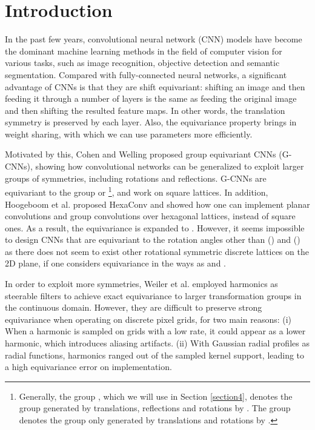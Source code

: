 \documentclass{article}
\begin{document}
\section{Introduction \label{intro}}
In the past few years, convolutional neural network (CNN) models have become the dominant machine learning methods in the field of computer vision for various tasks, such as image recognition, objective detection and semantic segmentation. Compared with fully-connected neural networks, a significant advantage of CNNs is that they are shift equivariant: shifting an image and then feeding it through a number of layers is the same as feeding the original image and then shifting the resulted feature maps. In other words, the translation symmetry is preserved by each layer. Also, the equivariance property brings in weight sharing, with which we can use parameters more efficiently.

Motivated by this, Cohen and Welling  proposed group equivariant CNNs (G-CNNs), showing how convolutional networks can be generalized to exploit larger groups of symmetries, including rotations and reflections. G-CNNs are equivariant to the group  or \footnote{Generally, the group , which we will use in Section \ref{section4}, denotes the group generated by translations, reflections and rotations by . The group  denotes the group only generated by translations and rotations by .}, and work on square lattices. In addition, Hoogeboom et al.  proposed HexaConv and showed how one can implement planar convolutions and group convolutions over hexagonal lattices, instead of square ones. As a result, the equivariance is expanded to . However, it seems impossible to design CNNs that are equivariant to the rotation angles other than  () and  () as there does not seem to exist other rotational symmetric discrete lattices on the 2D plane, if one considers equivariance in the ways as \cite{cohen2016group} and \cite{hoogeboom2018hexaconv}.

In order to exploit more symmetries, Weiler et al.  employed harmonics as steerable filters to achieve exact equivariance to larger transformation groups in the continuous domain. However, they are difficult to preserve strong equivariance when operating on discrete pixel grids, for two main reasons: (i) When a harmonic is sampled on grids with a low rate, it could appear as a lower harmonic, which introduces aliasing artifacts. (ii) With Gaussian radial profiles as radial functions, harmonics ranged out of the sampled kernel support, leading to a high equivariance error on implementation.
\end{document}
